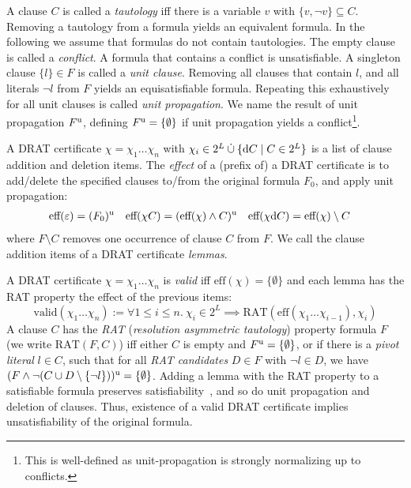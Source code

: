 \documentclass[smallcondensed]{svjour3}     %
\begin{document}
A clause $C$ is called a \emph{tautology} iff there is a variable $v$ with $\{v,\neg v\} \subseteq C$. Removing a tautology from a formula yields an equivalent formula.
In the following we assume that formulas do not contain tautologies.
The empty clause is called a \emph{conflict}. A formula that contains a conflict is unsatisfiable. 
A singleton clause $\{l\} \in F$ is called a \emph{unit clause}. Removing all clauses that contain $l$, and all literals $\neg l$ from $F$ yields an equisatisfiable formula.
Repeating this exhaustively for all unit clauses is called \emph{unit propagation}. 
We name the result of unit propagation $F^{\textrm u}$, defining $F^{\textrm u} = \{\emptyset\}$ if unit propagation yields a conflict\footnote{This is well-defined as unit-propagation is strongly normalizing up to conflicts.}.

A DRAT certificate $\chi = \chi_1\ldots\chi_n$ with $\chi_i \in 2^L \mathbin{\dot\cup} \{ \textrm d C \mid C\in 2^L \}$
is a list of clause addition and deletion items.
The \emph{effect} of a (prefix of) a DRAT certificate is to add/delete the specified clauses to/from the original formula $F_0$, and apply unit propagation:
\begin{align*}
  \textrm{eff}(\varepsilon) &= (F_0)^\textrm{u}&
  \textrm{eff}(\chi C) &= (\textrm{eff}(\chi) \wedge C)^\textrm{u}&
  \textrm{eff}(\chi\textrm d C) &= \textrm{eff}(\chi) \setminus C
\end{align*}
where $F \setminus C$ removes one occurrence of clause $C$ from $F$. %
We call the clause addition items of a DRAT certificate \emph{lemmas}.

A DRAT certificate $\chi = \chi_1\ldots\chi_n$ is \emph{valid} iff $\textrm{eff}(\chi) = \{\emptyset\}$ and each lemma has the RAT property \wrt the effect of the previous items:
\[
  \textrm{valid}(\chi_1 \ldots \chi_n) := \forall 1\le i\le n.~\chi_i\in2^L \implies\textrm{RAT}( \textrm{eff}(\chi_1\ldots \chi_{i-1}), \chi_i )
\]
A clause $C$ has the \emph{RAT} (\emph{resolution asymmetric tautology}) property \wrt formula $F$ (we write $\textrm{RAT}(F,C)$) iff either $C$ is empty and $F^{\textrm u}=\{\emptyset\}$,
or if there is a \emph{pivot literal} $l\in C$, such that for all \emph{RAT candidates} $D\in F$ with $\neg l \in D$, we have $(F \wedge \neg(C \cup D\setminus\{\neg l\}))^{\textrm u} = \{\emptyset\}$.
Adding a lemma with the RAT property to a satisfiable formula preserves satisfiability~\cite{WHH13}, and so do unit propagation and deletion of clauses. Thus, existence of a valid DRAT certificate implies unsatisfiability of the original formula.
\end{document}
